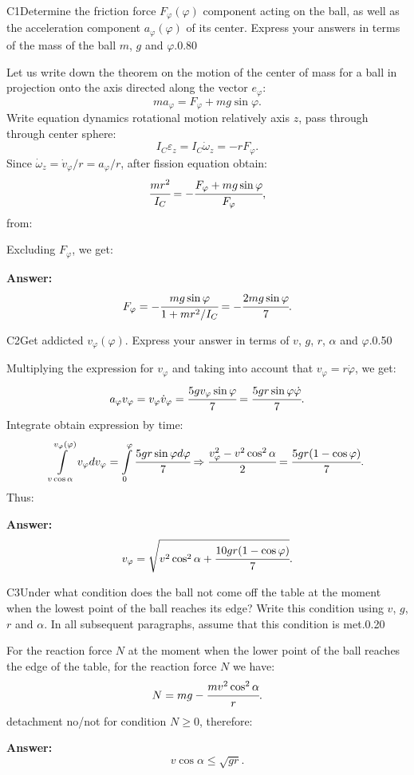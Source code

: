 \documentclass[11pt,a4paper]{article}
\begin{document}
\begin{solcard}{C1}{Determine the friction force $F_\varphi(\varphi)$ component acting on the ball, as well as the acceleration component $a_\varphi(\varphi)$ of its center. Express your answers in terms of the mass of the ball $m$, $g$ and $\varphi$.}{0.80}

Let us write down the theorem on the motion of the center of mass for a ball in projection onto the axis directed along the vector $e_\varphi$: $$ma_\varphi=F_\varphi+mg\sin\varphi{.} $$Write equation dynamics rotational motion relatively axis $z$, pass through through center sphere: $$I_C\varepsilon_z=I_C\dot{\omega}_z=-rF_\varphi{.} $$Since $\dot{\omega}_z=\dot{v}_\varphi/r=a_\varphi/r$, after fission equation obtain: $$\cfrac{mr^2}{I_C}=-\cfrac{F_\varphi+mg\sin\varphi}{F_\varphi}{,} $$from:


Excluding $F_\varphi$, we get:

\par\smallskip\noindent\textbf{Answer:} $$F_\varphi=-\cfrac{mg\sin\varphi}{1+mr^2/I_C}=-\cfrac{2mg\sin\varphi}{7}{.} $$
\end{solcard}

\begin{solcard}{C2}{Get addicted $v_\varphi(\varphi)$. Express your answer in terms of $v$, $g$, $r$, $\alpha$ and $\varphi$.}{0.50}

Multiplying the expression for $v_\varphi$ and taking into account that $v_\varphi=r\dot{\varphi}$, we get: $$a_\varphi v_\varphi=v_\varphi\dot{v}_\varphi=\cfrac{5gv_\varphi\sin\varphi}{7}=\cfrac{5gr\sin\varphi\dot{\varphi}}{7}{.} $$Integrate obtain expression by time: $$\int\limits_{v\cos\alpha}^{v_\varphi(\varphi)}v_\varphi dv_\varphi=\int\limits_{0}^{\varphi}\cfrac{5gr\sin\varphi d\varphi}{7}\Rightarrow \cfrac{v^2_\varphi-v^2\cos^2\alpha}{2}=\cfrac{5gr(1-\cos\varphi)}{7}{.} $$Thus:

\par\smallskip\noindent\textbf{Answer:} $$v_\varphi=\sqrt{v^2\cos^2\alpha+\cfrac{10gr(1-\cos\varphi)}{7}}{.} $$
\end{solcard}

\begin{solcard}{C3}{Under what condition does the ball not come off the table at the moment when the lowest point of the ball reaches its edge? Write this condition using $v$, $g$, $r$ and $\alpha$. In all subsequent paragraphs, assume that this condition is met.}{0.20}

For the reaction force $N$ at the moment when the lower point of the ball reaches the edge of the table, for the reaction force $N$ we have: $$N=mg-\cfrac{mv^2\cos^2\alpha}{r}{.} $$detachment no/not for condition $N\geq{0}$, therefore:

\par\smallskip\noindent\textbf{Answer:} $$v\cos\alpha\leq\sqrt{gr}{.} $$
\end{solcard}
\end{document}
